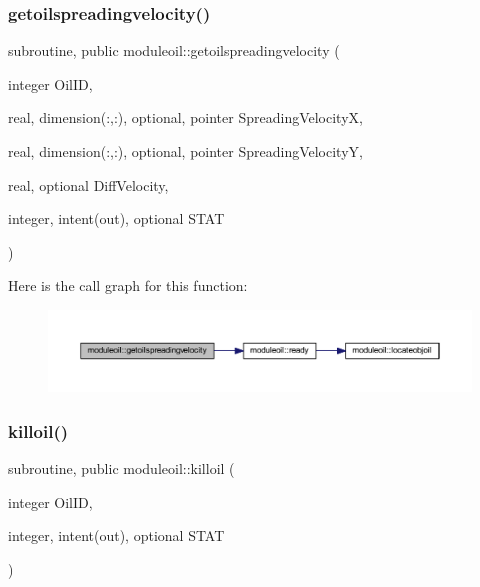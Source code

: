 \subsubsection{\texorpdfstring{getoilspreadingvelocity()}{getoilspreadingvelocity()}}
{\footnotesize\ttfamily subroutine, public moduleoil\+::getoilspreadingvelocity (\begin{DoxyParamCaption}\item[{integer}]{Oil\+ID,  }\item[{real, dimension(\+:,\+:), optional, pointer}]{Spreading\+VelocityX,  }\item[{real, dimension(\+:,\+:), optional, pointer}]{Spreading\+VelocityY,  }\item[{real, optional}]{Diff\+Velocity,  }\item[{integer, intent(out), optional}]{S\+T\+AT }\end{DoxyParamCaption})}

Here is the call graph for this function\+:\nopagebreak
\begin{figure}[H]
\begin{center}
\leavevmode
\includegraphics[width=350pt]{namespacemoduleoil_a110af1cd38e3c7128a98fb3d2bed2fdb_cgraph}
\end{center}
\end{figure}
\mbox{\label{namespacemoduleoil_a3515505fcda962cedd51dd5986ff6777}} 
\subsubsection{\texorpdfstring{killoil()}{killoil()}}
{\footnotesize\ttfamily subroutine, public moduleoil\+::killoil (\begin{DoxyParamCaption}\item[{integer}]{Oil\+ID,  }\item[{integer, intent(out), optional}]{S\+T\+AT }\end{DoxyParamCaption})}

